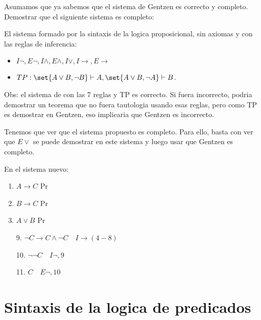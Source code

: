 \begin{example}
	Asumamos que ya sabemos que el sistema de Gentzen es correcto y completo. Demostrar que el siguiente sistema es completo:

	El sistema formado por la sintaxis de la logica proposicional, sin axiomas y con las reglas de inferencia:
	\begin{itemize}
		\item \(I \neg, E \neg, I \wedge, E \wedge, I \vee, I \to, E \to \)
		\item \(TP: \set{A \vee B, \neg B} \vdash A, \set{A \vee B, \neg A } \vdash B \).
	\end{itemize}

	Obs: el sistema de con las 7 reglas y TP es correcto. Si fuera incorrecto, podria demostrar un teorema que no fuera tautologia usando esas reglas, pero como TP es demostrar en Gentzen, eso implicaria que Gentzen es incorrecto.

	Tenemos que ver que el sistema propuesto es completo. Para ello, basta con ver que \(E\vee \) se puede demostrar en este sistema y luego usar que Gentzen es completo.

	En el sistema nuevo:
	\begin{enumerate}
		\item \(A \rightarrow C \) Pr
		\item \(B \rightarrow C \) Pr
		\item \(A \vee B \) Pr
	\end{enumerate}
	\begin{enumerate}
		\item[9.] \(\neg C \rightarrow C \wedge \neg C \quad I\rightarrow(4-8)\)
		\item[10.] \(\neg \neg C \quad I\neg,9\)
		\item[11.] \(C \quad E\neg, 10\)
	\end{enumerate}
\end{example}

\part{Sintaxis de la logica de predicados}
